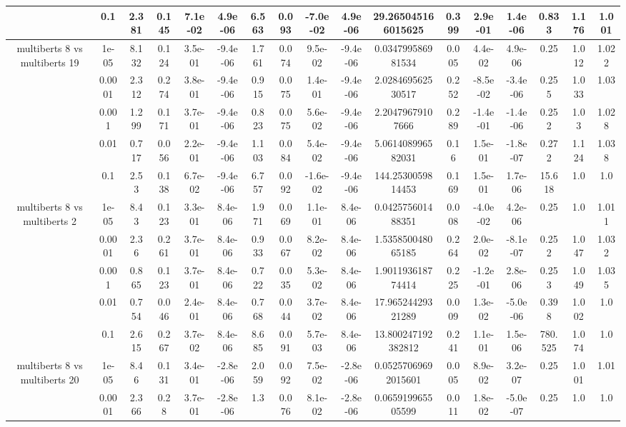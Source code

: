\begin{tabular}{|c|c|c|c|c|c|c|c|c|c|c|c|c|c|c|c|c|}
 & 0.1 & 2.381 & 0.145 & 7.1e-02 & 4.9e-06 & 6.563 & 0.093 & -7.0e-02 & 4.9e-06 & 29.265045166015625 & 0.399 & 2.9e-01 & 1.4e-06 & 0.833 & 1.176 & 1.001 \\
\hline
\multirow{5}{*}{multiberts 8 vs multiberts 19} & 1e-05 & 8.132 & 0.124 & 3.5e-01 & -9.4e-06 & 1.761 & 0.074 & 9.5e-02 & -9.4e-06 & 0.034799586981534 & 0.005 & 4.4e-02 & 4.9e-06 & 0.25 & 1.012 & 1.022 \\
 & 0.0001 & 2.312 & 0.274 & 3.8e-01 & -9.4e-06 & 0.915 & 0.075 & 1.4e-01 & -9.4e-06 & 2.028469562530517 & 0.252 & -8.5e-02 & -3.4e-06 & 0.255 & 1.033 & 1.03 \\
 & 0.001 & 1.299 & 0.171 & 3.7e-01 & -9.4e-06 & 0.823 & 0.075 & 5.6e-02 & -9.4e-06 & 2.20479679107666 & 0.289 & -1.4e-01 & -1.4e-06 & 0.252 & 1.03 & 1.028 \\
 & 0.01 & 0.717 & 0.056 & 2.2e-01 & -9.4e-06 & 1.103 & 0.084 & 5.4e-02 & -9.4e-06 & 5.061408996582031 & 0.16 & 1.5e-01 & -1.8e-07 & 0.272 & 1.124 & 1.038 \\
 & 0.1 & 2.53 & 0.138 & 6.7e-02 & -9.4e-06 & 6.757 & 0.092 & -1.6e-02 & -9.4e-06 & 144.2530059814453 & 0.169 & 1.5e-01 & 1.7e-06 & 15.618 & 1.0 & 1.0 \\
\hline
\multirow{5}{*}{multiberts 8 vs multiberts 2} & 1e-05 & 8.43 & 0.123 & 3.3e-01 & 8.4e-06 & 1.971 & 0.069 & 1.1e-01 & 8.4e-06 & 0.042575601488351 & 0.008 & -4.0e-02 & 4.2e-06 & 0.25 & 1.0 & 1.011 \\
 & 0.0001 & 2.36 & 0.261 & 3.7e-01 & 8.4e-06 & 0.933 & 0.067 & 8.2e-02 & 8.4e-06 & 1.535850048065185 & 0.264 & 2.0e-02 & -8.1e-07 & 0.252 & 1.047 & 1.032 \\
 & 0.001 & 0.865 & 0.123 & 3.7e-01 & 8.4e-06 & 0.722 & 0.035 & 5.3e-02 & 8.4e-06 & 1.901193618774414 & 0.225 & -1.2e-01 & 2.8e-06 & 0.253 & 1.049 & 1.035 \\
 & 0.01 & 0.754 & 0.046 & 2.4e-01 & 8.4e-06 & 0.768 & 0.044 & 3.7e-02 & 8.4e-06 & 17.96524429321289 & 0.009 & 1.3e-02 & -5.0e-06 & 0.398 & 1.002 & 1.0 \\
 & 0.1 & 2.615 & 0.267 & 3.7e-02 & 8.4e-06 & 8.685 & 0.091 & 5.7e-03 & 8.4e-06 & 13.800247192382812 & 0.241 & 1.1e-01 & 1.5e-06 & 780.525 & 1.074 & 1.0 \\
\hline
\multirow{5}{*}{multiberts 8 vs multiberts 20} & 1e-05 & 8.46 & 0.131 & 3.4e-01 & -2.8e-06 & 2.059 & 0.092 & 7.5e-02 & -2.8e-06 & 0.05257069692015601 & 0.005 & 8.9e-02 & 3.2e-07 & 0.25 & 1.001 & 1.01 \\
 & 0.0001 & 2.366 & 0.28 & 3.7e-01 & -2.8e-06 & 1.3 & 0.076 & 8.1e-02 & -2.8e-06 & 0.065919965505599 & 0.011 & 1.8e-02 & -5.0e-07 & 0.25 & 1.0 & 1.0 \\

\end{tabular}
